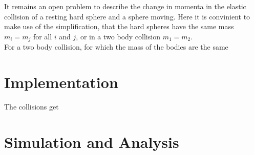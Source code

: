 \documentclass{article}
\begin{document}
    It remains an open problem to describe the change in momenta in the elastic collision of a resting hard sphere and a sphere moving. Here it is convinient to make use of the simplification, that the hard spheres have the same mass $m_i=m_j$ for all $i$ and $j$, or in a two body collision $m_1=m_2$. \\

    For a two body collision, for which the mass of the bodies are the same 

\section{Implementation}

The collisions get 

\section{Simulation and Analysis}
\end{document}
